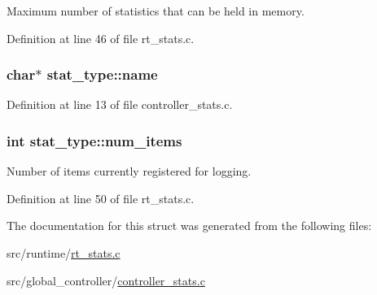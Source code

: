 Maximum number of statistics that can be held in memory. 



Definition at line 46 of file rt\-\_\-stats.\-c.

\hypertarget{structstat__type_ae4e7f67c4950bcfbe35ba672bcfd6923}{
\subsubsection[{name}]{\setlength{\rightskip}{0pt plus 5cm}char$\ast$ stat\-\_\-type\-::name}}\label{structstat__type_ae4e7f67c4950bcfbe35ba672bcfd6923}


Definition at line 13 of file controller\-\_\-stats.\-c.

\hypertarget{structstat__type_a58e7d3ee8ef48ab267367fc3266a9113}{
\subsubsection[{num\-\_\-items}]{\setlength{\rightskip}{0pt plus 5cm}int stat\-\_\-type\-::num\-\_\-items}}\label{structstat__type_a58e7d3ee8ef48ab267367fc3266a9113}


Number of items currently registered for logging. 



Definition at line 50 of file rt\-\_\-stats.\-c.



The documentation for this struct was generated from the following files\-:\begin{DoxyCompactItemize}
\item 
src/runtime/\hyperlink{rt__stats_8c}{rt\-\_\-stats.\-c}\item 
src/global\-\_\-controller/\hyperlink{controller__stats_8c}{controller\-\_\-stats.\-c}\end{DoxyCompactItemize}
